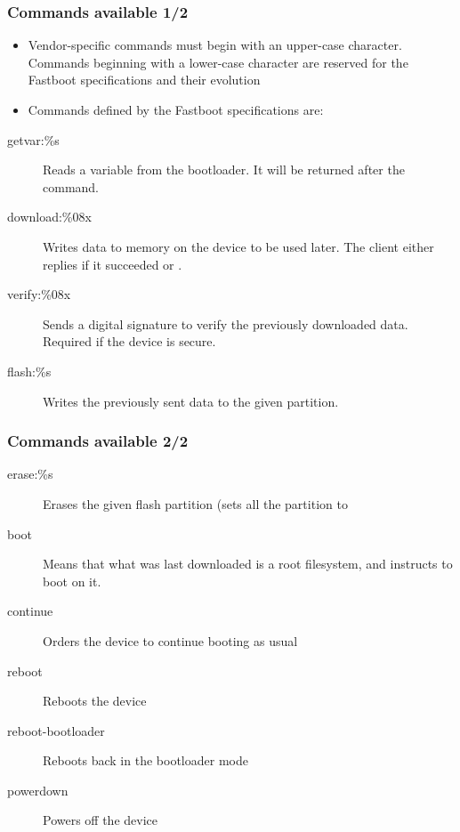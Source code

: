 \begin{frame}
  \frametitle{Commands available 1/2}
  \begin{itemize}
  \item Vendor-specific commands must begin with an upper-case
    character. Commands beginning with a lower-case character are reserved
    for the Fastboot specifications and their evolution
  \item Commands defined by the Fastboot specifications are:
  \end{itemize}
  \begin{description}
  \item[getvar:\%s] Reads a variable from the bootloader. It will be
    returned after the  command.
  \item[download:\%08x] Writes data to memory on the device to be used
    later. The client either replies  if it succeeded
    or .
  \item[verify:\%08x] Sends a digital signature to verify the
    previously downloaded data. Required if the device is secure.
  \item[flash:\%s] Writes the previously sent data to the given
    partition.
  \end{description}
\end{frame}

\begin{frame}
  \frametitle{Commands available 2/2}
  \begin{description}
  \item[erase:\%s] Erases the given flash partition (sets all the
    partition to 
  \item[boot] Means that what was last downloaded is a root filesystem, 
    and instructs to boot on it.
  \item[continue] Orders the device to continue booting as usual
  \item[reboot] Reboots the device
  \item[reboot-bootloader] Reboots back in the bootloader mode
  \item[powerdown] Powers off the device
  \end{description}
\end{frame}

